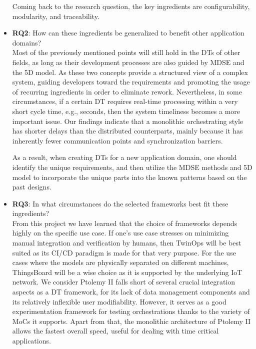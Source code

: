 \begin{itemize}
	Coming back to the research question, the key ingredients are configurability, modularity, and traceability. 
	
  \item  \textbf{RQ2}: How can these ingredients be generalized to benefit other application domains? \\ \newline
  Most of the previously mentioned points will still hold in the DTs of other fields, as long as their development processes are also guided by MDSE and the 5D model. As these two concepts provide a structured view of a complex system, guiding developers toward the requirements and promoting the usage of recurring ingredients in order to eliminate rework. Nevertheless, in some circumstances, if a certain DT requires real-time processing within a very short cycle time, e.g., seconds, then the system timeliness becomes a more important issue. Our findings indicate that a monolithic orchestrating style has shorter delays than the distributed counterparts, mainly because it has inherently fewer communication points and synchronization barriers.
  
  As a result, when creating DTs for a new application domain, one should identify the unique requirements, and then utilize the MDSE methods and 5D model to incorporate the unique parts into the known patterns based on the past designs.
   
  \item  \textbf{RQ3}: In what circumstances do the selected frameworks best fit these ingredients?   \\ \newline  
  From this project we have learned that the choice of frameworks depends highly on the specific use case. If one's use case stresses on minimizing manual integration and verification by humans, then TwinOps will be best suited as its CI/CD paradigm is made for that very purpose. For the use cases where the models are physically separated on different machines, ThingsBoard will be a wise choice as it is supported by the underlying IoT network. We consider Ptolemy II falls short of several crucial integration aspects as a DT framework, for its lack of data management components and its relatively inflexible user modifiability. However, it serves as a good experimentation framework for testing orchestrations thanks to the variety of MoCs it supports. Apart from that, the monolithic architecture of Ptolemy II allows the fastest overall speed, useful for dealing with time critical applications.
  
\end{itemize}

